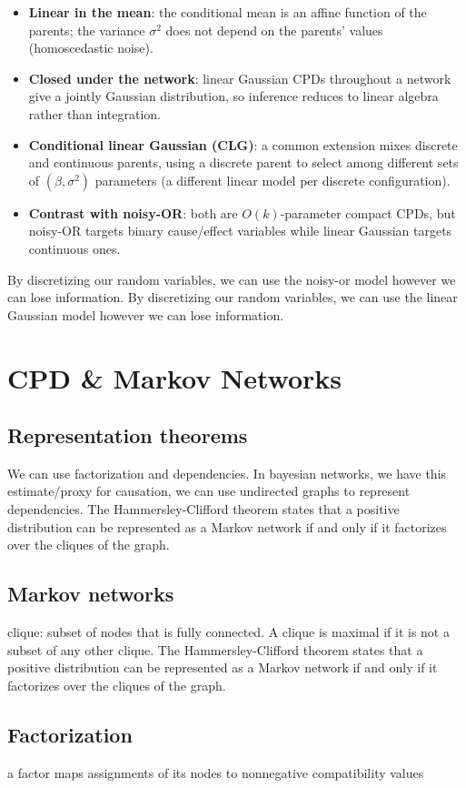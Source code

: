 \documentclass[11pt]{article}
\begin{document}
\begin{itemize}
  \item \textbf{Linear in the mean}: the conditional mean is an affine function
    of the parents; the variance $\sigma^2$ does not depend on the parents'
    values (homoscedastic noise).
  \item \textbf{Closed under the network}: linear Gaussian CPDs throughout a
    network give a jointly Gaussian distribution, so inference reduces to
    linear algebra rather than integration.
  \item \textbf{Conditional linear Gaussian (CLG)}: a common extension mixes
    discrete and continuous parents, using a discrete parent to select among
    different sets of $(\beta, \sigma^2)$ parameters (a different linear model
    per discrete configuration).
  \item \textbf{Contrast with noisy-OR}: both are $O(k)$-parameter compact CPDs,
    but noisy-OR targets binary cause/effect variables while linear Gaussian
    targets continuous ones.
\end{itemize}

By discretizing our random variables, we can use the noisy-or model however we can lose information. By discretizing our random variables, we can use the linear Gaussian model however we can lose information.

\section{CPD & Markov Networks}
\subsection{Representation theorems}
We can use factorization and dependencies.
In bayesian networks, we have this estimate/proxy for causation, we can use undirected graphs to represent dependencies. The Hammersley-Clifford theorem states that a positive distribution can be represented as a Markov network if and only if it factorizes over the cliques of the graph.
\subsection{Markov networks}
clique: subset of nodes that is fully connected. A clique is maximal if it is not a subset of any other clique. The Hammersley-Clifford theorem states that a positive distribution can be represented as a Markov network if and only if it factorizes over the cliques of the graph.
\subsection{Factorization}
a factor maps assignments of its nodes to nonnegative compatibility values
\end{document}
